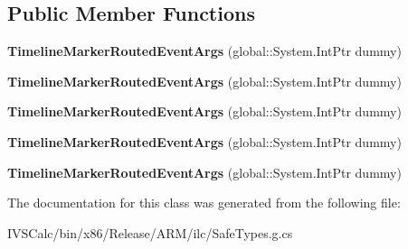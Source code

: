 \subsection*{Public Member Functions}
\begin{DoxyCompactItemize}
\item 
\mbox{\label{class_windows_1_1_u_i_1_1_xaml_1_1_media_1_1_timeline_marker_routed_event_args_a5f584d640c4c5f23c00d4618aa8cf8ce}} 
{\bfseries Timeline\+Marker\+Routed\+Event\+Args} (global\+::\+System.\+Int\+Ptr dummy)
\item 
\mbox{\label{class_windows_1_1_u_i_1_1_xaml_1_1_media_1_1_timeline_marker_routed_event_args_a5f584d640c4c5f23c00d4618aa8cf8ce}} 
{\bfseries Timeline\+Marker\+Routed\+Event\+Args} (global\+::\+System.\+Int\+Ptr dummy)
\item 
\mbox{\label{class_windows_1_1_u_i_1_1_xaml_1_1_media_1_1_timeline_marker_routed_event_args_a5f584d640c4c5f23c00d4618aa8cf8ce}} 
{\bfseries Timeline\+Marker\+Routed\+Event\+Args} (global\+::\+System.\+Int\+Ptr dummy)
\item 
\mbox{\label{class_windows_1_1_u_i_1_1_xaml_1_1_media_1_1_timeline_marker_routed_event_args_a5f584d640c4c5f23c00d4618aa8cf8ce}} 
{\bfseries Timeline\+Marker\+Routed\+Event\+Args} (global\+::\+System.\+Int\+Ptr dummy)
\item 
\mbox{\label{class_windows_1_1_u_i_1_1_xaml_1_1_media_1_1_timeline_marker_routed_event_args_a5f584d640c4c5f23c00d4618aa8cf8ce}} 
{\bfseries Timeline\+Marker\+Routed\+Event\+Args} (global\+::\+System.\+Int\+Ptr dummy)
\end{DoxyCompactItemize}


The documentation for this class was generated from the following file\+:\begin{DoxyCompactItemize}
\item 
I\+V\+S\+Calc/bin/x86/\+Release/\+A\+R\+M/ilc/Safe\+Types.\+g.\+cs\end{DoxyCompactItemize}
